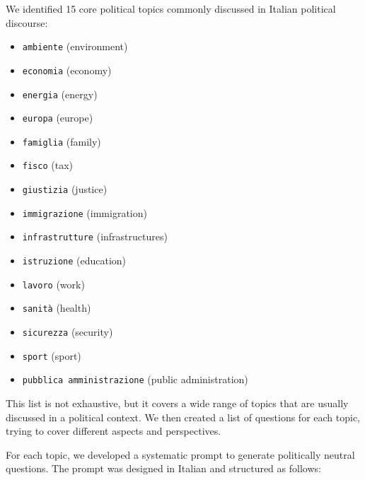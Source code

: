 \documentclass[10pt]{article}
\begin{document}
We identified 15 core political topics commonly discussed in Italian political discourse:
\begin{itemize}
    \item \texttt{ambiente} (environment)
    \item \texttt{economia} (economy)
    \item \texttt{energia} (energy)
    \item \texttt{europa} (europe)
    \item \texttt{famiglia} (family)
    \item \texttt{fisco} (tax)
    \item \texttt{giustizia} (justice)
    \item \texttt{immigrazione} (immigration)
    \item \texttt{infrastrutture} (infrastructures)
    \item \texttt{istruzione} (education)
    \item \texttt{lavoro} (work)
    \item \texttt{sanità} (health)
    \item \texttt{sicurezza} (security)
    \item \texttt{sport} (sport)
    \item \texttt{pubblica amministrazione} (public administration)
\end{itemize}

This list is not exhaustive, but it covers a wide range of topics that are usually discussed in a political context. We then created a list of questions for each topic, trying to cover different aspects and perspectives.

For each topic, we developed a systematic prompt to generate politically neutral questions. The prompt was designed in Italian and structured as follows:
\end{document}
